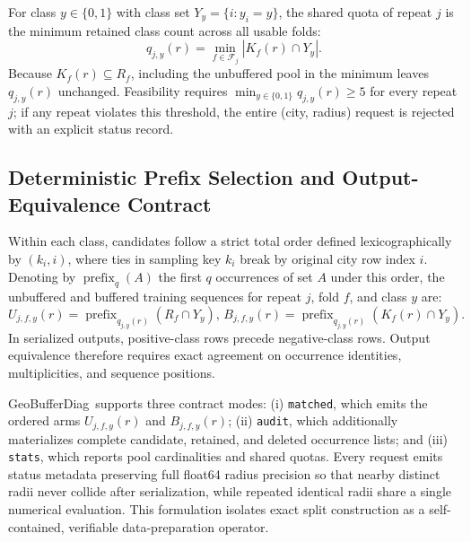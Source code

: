 \documentclass[sigconf, nonacm]{acmart}
\newcommand{\sys}{GeoBufferDiag}
\newcommand{\matched}{\texttt{matched}}
\newcommand{\audit}{\texttt{audit}}
\newcommand{\stats}{\texttt{stats}}
\newcommand{\pref}{\operatorname{prefix}}
\begin{document}
For class $y\in\{0,1\}$ with class set $Y_y=\{i: y_i=y\}$, the shared quota of repeat $j$ is the minimum retained class count across all usable folds:
\begin{equation}
q_{j,y}(r)=\min_{f\in\mathcal{F}_j}|K_f(r)\cap Y_y|.
\label{eq:quota}
\end{equation}
Because $K_f(r)\subseteq R_f$, including the unbuffered pool in the minimum leaves $q_{j,y}(r)$ unchanged. Feasibility requires $\min_{y\in\{0,1\}} q_{j,y}(r)\ge 5$ for every repeat $j$; if any repeat violates this threshold, the entire (city, radius) request is rejected with an explicit status record.

\subsection{Deterministic Prefix Selection and Output-Equivalence Contract}
Within each class, candidates follow a strict total order defined lexicographically by $(k_i,i)$, where ties in sampling key $k_i$ break by original city row index $i$. Denoting by $\pref_q(A)$ the first $q$ occurrences of set $A$ under this order, the unbuffered and buffered training sequences for repeat $j$, fold $f$, and class $y$ are:
\begin{equation}
U_{j,f,y}(r)=\pref_{q_{j,y}(r)}(R_f\cap Y_y),
\,
B_{j,f,y}(r)=\pref_{q_{j,y}(r)}(K_f(r)\cap Y_y).
\label{eq:prefix}
\end{equation}
In serialized outputs, positive-class rows precede negative-class rows. Output equivalence therefore requires exact agreement on occurrence identities, multiplicities, and sequence positions.

\sys\ supports three contract modes: (i) \matched, which emits the ordered arms $U_{j,f,y}(r)$ and $B_{j,f,y}(r)$; (ii) \audit, which additionally materializes complete candidate, retained, and deleted occurrence lists; and (iii) \stats, which reports pool cardinalities and shared quotas. Every request emits status metadata preserving full float64 radius precision so that nearby distinct radii never collide after serialization, while repeated identical radii share a single numerical evaluation. This formulation isolates exact split construction as a self-contained, verifiable data-preparation operator.
\end{document}
